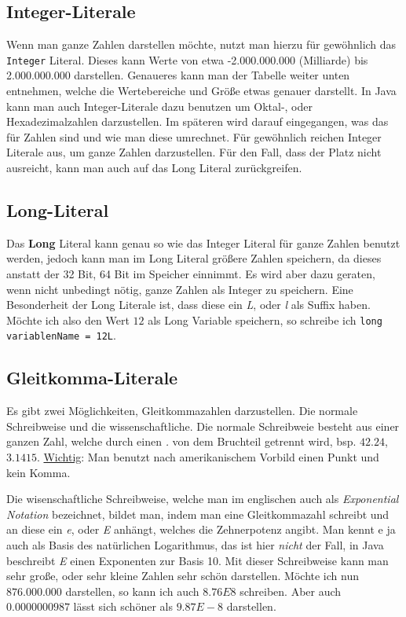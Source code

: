 \subsection{Integer-Literale}

Wenn man ganze Zahlen darstellen möchte, nutzt man hierzu für gewöhnlich das \texttt{Integer} Literal. Dieses kann Werte von etwa -2.000.000.000 (Milliarde) bis 2.000.000.000 darstellen. Genaueres kann man der Tabelle weiter unten entnehmen, welche die Wertebereiche und Größe etwas genauer darstellt. In Java kann man auch Integer-Literale dazu benutzen um Oktal-, oder Hexadezimalzahlen darzustellen. Im späteren wird darauf eingegangen, was das für Zahlen sind und wie man diese umrechnet. Für gewöhnlich reichen Integer Literale aus, um ganze Zahlen darzustellen. Für den Fall, dass der Platz nicht ausreicht, kann man auch auf das Long Literal zurückgreifen.

\subsection{Long-Literal}

Das \textbf{Long} Literal kann genau so wie das Integer Literal für ganze Zahlen benutzt werden, jedoch kann man im Long Literal größere Zahlen speichern, da dieses anstatt der 32 Bit, 64 Bit im Speicher einnimmt. Es wird aber dazu geraten, wenn nicht unbedingt nötig, ganze Zahlen als Integer zu speichern. Eine Besonderheit der Long Literale ist, dass diese ein \textit{L}, oder \textit{l} als Suffix haben. Möchte ich also den Wert $12$ als Long Variable speichern, so schreibe ich \texttt{long variablenName = 12L}.

\subsection{Gleitkomma-Literale}

Es gibt zwei Möglichkeiten, Gleitkommazahlen darzustellen. Die normale Schreibweise und die wissenschaftliche. Die normale Schreibweie besteht aus einer ganzen Zahl, welche durch einen \textit{.} von dem Bruchteil getrennt wird, bsp. $42.24$, $3.1415$. \underline{Wichtig}: Man benutzt nach amerikanischem Vorbild einen Punkt und kein Komma. 

Die wisenschaftliche Schreibweise, welche man im englischen auch als \textit{Exponential Notation} bezeichnet, bildet man, indem man eine Gleitkommazahl schreibt und an diese ein \textit{e}, oder \textit{E} anhängt, welches die Zehnerpotenz angibt. Man kennt e ja auch als Basis des natürlichen Logarithmus, das ist hier \textit{nicht} der Fall, in Java beschreibt \textit{E} einen Exponenten zur Basis 10. Mit dieser Schreibweise kann man sehr große, oder sehr kleine Zahlen sehr schön darstellen. Möchte ich nun $876.000.000$ darstellen, so kann ich auch $8.76E8$ schreiben. Aber auch $0.0000000987$ lässt sich schöner als $9.87E-8$ darstellen.

